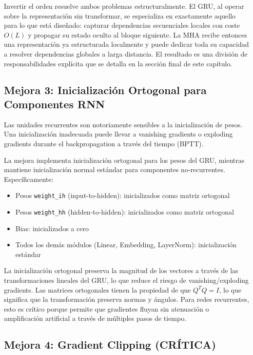 Invertir el orden resuelve ambos problemas estructuralmente. El GRU, al operar sobre la representación sin transformar, se especializa en exactamente aquello para lo que está diseñado: capturar dependencias secuenciales locales con coste $O(L)$ y propagar su estado oculto al bloque siguiente. La MHA recibe entonces una representación ya estructurada localmente y puede dedicar toda su capacidad a resolver dependencias globales a larga distancia. El resultado es una división de responsabilidades explícita que se detalla en la sección final de este capítulo.

\subsection{Mejora 3: Inicialización Ortogonal para Componentes RNN}

Las unidades recurrentes son notoriamente sensibles a la inicialización de pesos. Una inicialización inadecuada puede llevar a vanishing gradients o exploding gradients durante el backpropagation a través del tiempo (BPTT).

La mejora implementa inicialización ortogonal para los pesos del GRU, mientras mantiene inicialización normal estándar para componentes no-recurrentes. Específicamente:

\begin{itemize}
    \item Pesos \texttt{weight\_ih} (input-to-hidden): inicializados como matriz ortogonal
    \item Pesos \texttt{weight\_hh} (hidden-to-hidden): inicializados como matriz ortogonal
    \item Bias: inicializados a cero
    \item Todos los demás módulos (Linear, Embedding, LayerNorm): inicialización estándar
\end{itemize}

La inicialización ortogonal preserva la magnitud de los vectores a través de las transformaciones lineales del GRU, lo que reduce el riesgo de vanishing/exploding gradients. Las matrices ortogonales tienen la propiedad de que $Q^T Q = I$, lo que significa que la transformación preserva normas y ángulos. Para redes recurrentes, esto es crítico porque permite que gradientes fluyan sin atenuación o amplificación artificial a través de múltiples pasos de tiempo.

\subsection{Mejora 4: Gradient Clipping (CRÍTICA)}

